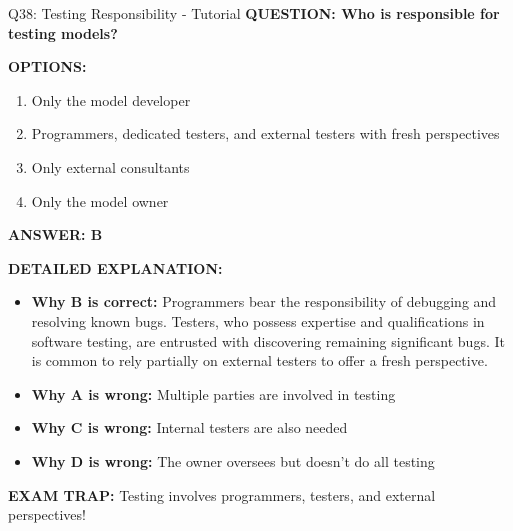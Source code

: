 \documentclass[8pt]{beamer}
\begin{document}
	\begin{frame}{Q38: Testing Responsibility - Tutorial}
		\fontsize{6.5}{7.5}\selectfont
		\textbf{QUESTION: Who is responsible for testing models?}
		
		\vspace{0.1cm}
		\textbf{OPTIONS:}
		\begin{enumerate}
			\item Only the model developer
			\item Programmers, dedicated testers, and external testers with fresh perspectives
			\item Only external consultants
			\item Only the model owner
		\end{enumerate}
		
		\vspace{0.1cm}
		\textcolor{myblue}{\textbf{ANSWER: B}}
		
		\vspace{0.1cm}
		\textbf{DETAILED EXPLANATION:}
		\begin{itemize}
			\item \textbf{Why B is correct:} Programmers bear the responsibility of debugging and resolving known bugs. Testers, who possess expertise and qualifications in software testing, are entrusted with discovering remaining significant bugs. It is common to rely partially on external testers to offer a fresh perspective.
			\item \textbf{Why A is wrong:} Multiple parties are involved in testing
			\item \textbf{Why C is wrong:} Internal testers are also needed
			\item \textbf{Why D is wrong:} The owner oversees but doesn't do all testing
		\end{itemize}
		
		\textcolor{myred}{\textbf{EXAM TRAP:}} Testing involves \textcolor{myblue}{programmers, testers, and external perspectives}!
	\end{frame}
	
\end{document}
